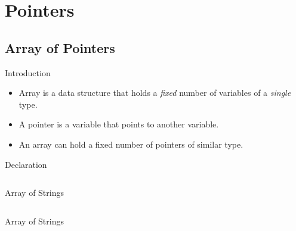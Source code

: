 \documentclass[compress]{beamer}
\begin{document}
\prepareCover

\section{Pointers}

\subsection{Array of Pointers}

\begin{slide}
	\begin{block}{Introduction}

	\begin{itemize}
	\item[] Array is a data structure that holds a \emph{fixed} number of variables of a \emph{single} type.
	\item[] A pointer is a \alert{variable} that points to another variable.
	\item[] An array can hold a fixed number of pointers of similar type.
	\end{itemize}

	\end{block}
\end{slide}

\begin{slide}
	\begin{block}{Declaration}

	\inputminted[fontsize=\footnotesize, firstline=10, linenos]{c}{
		\resDirectory/ls12-array1.c
	}

	\end{block}
\end{slide}

\begin{slide}
	\begin{block}{Array of Strings}

	\inputminted[fontsize=\footnotesize, firstline=10, linenos]{c}{
		\resDirectory/ls12-array2.c
	}

	\end{block}
\end{slide}

\begin{slide}
	\begin{block}{Array of Strings}

	\inputminted[fontsize=\footnotesize, firstline=10, linenos]{c}{
		\resDirectory/ls12-array3.c
	}

	\end{block}
\end{slide}
\end{document}
